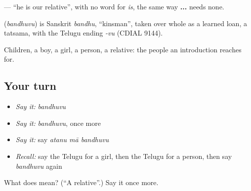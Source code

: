 \textbf{  } — \textquotedblleft{}he is our relative\textquotedblright{}, with no word for \emph{is}, the same way \textbf{  ...} needs none.

\begin{cousinweb}
\textbf{} (\emph{bandhuvu}) is Sanskrit \emph{bandhu}, \textquotedblleft{}kinsman\textquotedblright{}, taken over whole as a learned loan, a tatsama, with the Telugu ending \emph{-vu} (CDIAL 9144).
\end{cousinweb}

\begin{grammarlens}[title={What you've built}]
Children, a boy, a girl, a person, a relative: the people an introduction reaches for.
\end{grammarlens}

\subsection*{Your turn}
\begin{itemize}
\raggedright
  \item \emph{Say it:} \emph{bandhuvu}
  \item \emph{Say it:} \emph{bandhuvu}, once more
  \item \emph{Say it:} say \emph{atanu mā bandhuvu}
  \item \emph{Recall:} say the Telugu for a girl, then the Telugu for a person, then say \emph{bandhuvu} again
\end{itemize}

\begin{tcolorbox}[breakable,colback=teal!4,colframe=teal!35!black,title={Before you move on}]
What does  mean? (\textquotedblleft{}A relative\textquotedblright{}.) Say it once more.
\end{tcolorbox}

